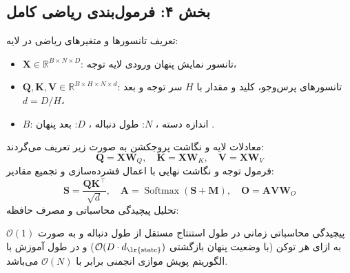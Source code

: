 \subsection*{بخش ۴: فرمول‌بندی ریاضی کامل }
تعریف تانسورها و متغیرهای ریاضی در لایه:
\begin{itemize}
    \item $\mathbf{X} \in \mathbb{R}^{B \times N \times D}$: تانسور نمایش پنهان ورودی لایه توجه،
    \item $\mathbf{Q}, \mathbf{K}, \mathbf{V} \in \mathbb{R}^{B \times H \times N \times d}$: تانسورهای پرس‌وجو، کلید و مقدار با $H$ سر توجه و بعد $d = D/H$،
    \item $B$: اندازه دسته ، $N$: طول دنباله ، $D$: بعد پنهان .
\end{itemize}
معادلات لایه و نگاشت پروجکشن به صورت زیر تعریف می‌گردند:
\begin{equation}
\mathbf{Q} = \mathbf{X} \mathbf{W}_Q, \quad \mathbf{K} = \mathbf{X} \mathbf{W}_K, \quad \mathbf{V} = \mathbf{X} \mathbf{W}_V
\end{equation}
فرمول توجه و نگاشت نهایی با اعمال فشرده‌سازی و تجمیع مقادیر:
\begin{equation}
\mathbf{S} = \frac{\mathbf{Q} \mathbf{K}^\top}{\sqrt{d}}, \quad \mathbf{A} = \operatorname{Softmax}\left( \mathbf{S} + \mathbf{M} \right), \quad \mathbf{O} = \mathbf{A} \mathbf{V} \mathbf{W}_O
\end{equation}
تحلیل پیچیدگی محاسباتی و مصرف حافظه:

پیچیدگی محاسباتی زمانی در طول استنتاج مستقل از طول دنباله و به صورت $\mathcal{O}(1)$ به ازای هر توکن (با وضعیت پنهان بازگشتی $\mathcal{O}(D \cdot d_{\text{\lr{state}}})$) و در طول آموزش با الگوریتم پویش موازی انجمنی  برابر با $\mathcal{O}(N)$ می‌باشد.

